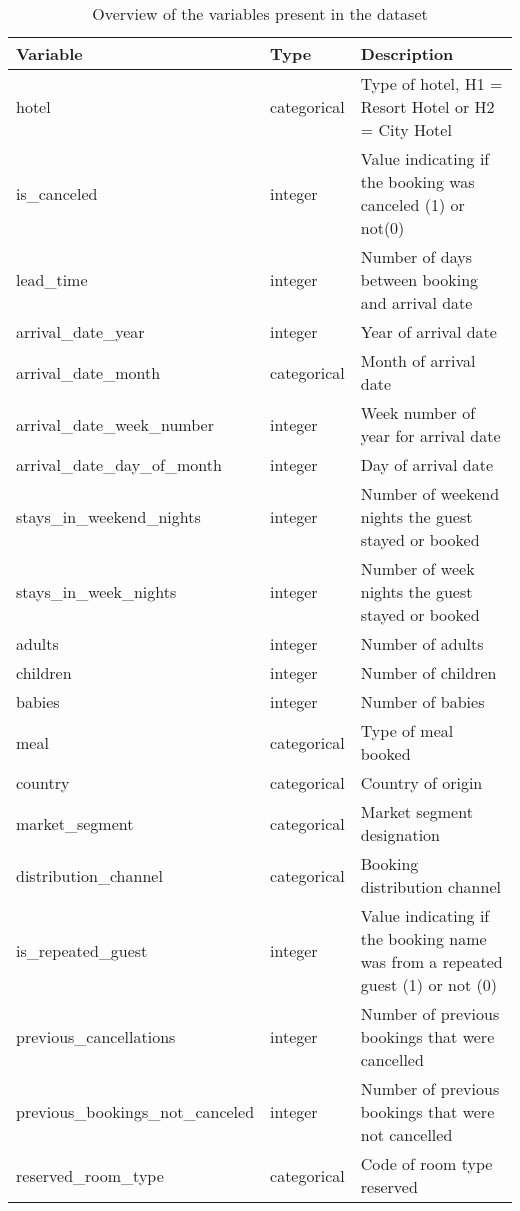 \documentclass[
]{article}
\begin{document}
\begin{table}

\caption{\label{tab:unnamed-chunk-1}Overview of the variables present in the dataset}
\centering
\begin{tabular}[t]{l|l|l}
\hline
Variable & Type & Description\\
\hline
hotel & categorical & Type of hotel, H1 = Resort Hotel or H2 = City Hotel\\
\hline
is\_canceled & integer & Value indicating if the booking was canceled (1) or not(0)\\
\hline
lead\_time & integer & Number of days between booking and arrival date\\
\hline
arrival\_date\_year & integer & Year of arrival date\\
\hline
arrival\_date\_month & categorical & Month of arrival date\\
\hline
arrival\_date\_week\_number & integer & Week number of year for arrival date\\
\hline
arrival\_date\_day\_of\_month & integer & Day of arrival date\\
\hline
stays\_in\_weekend\_nights & integer & Number of weekend nights the guest stayed or booked\\
\hline
stays\_in\_week\_nights & integer & Number of week nights the guest stayed or booked\\
\hline
adults & integer & Number of adults\\
\hline
children & integer & Number of children\\
\hline
babies & integer & Number of babies\\
\hline
meal & categorical & Type of meal booked\\
\hline
country & categorical & Country of origin\\
\hline
market\_segment & categorical & Market segment designation\\
\hline
distribution\_channel & categorical & Booking distribution channel\\
\hline
is\_repeated\_guest & integer & Value indicating if the booking name was from a repeated guest (1) or not (0)\\
\hline
previous\_cancellations & integer & Number of previous bookings that were cancelled\\
\hline
previous\_bookings\_not\_canceled & integer & Number of previous bookings that were not cancelled\\
\hline
reserved\_room\_type & categorical & Code of room type reserved\\

\end{tabular}
\end{table}
\end{document}
